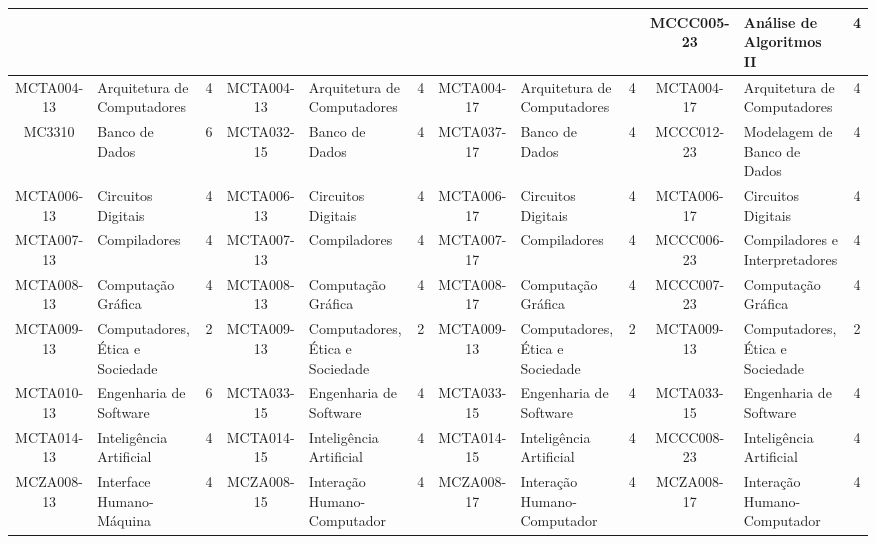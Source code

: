 \documentclass[a4paper]{article}
\begin{document}
\begin{landscape}
{\begin{longtable}{|c|p{.2\textheight}|c||c|p{.2\textheight}|c||c|p{.2\textheight}|c||c|p{.2\textheight}|c|}
    & & &
    & & &
    & & &
    MCCC005-23 & Análise de Algoritmos II & 4 \\ \hline

    MCTA004-13 & Arquitetura de Computadores & 4 &
    MCTA004-13 & Arquitetura de Computadores & 4 &
    MCTA004-17 & Arquitetura de Computadores & 4 &
    MCTA004-17 & Arquitetura de Computadores & 4 \\ \hline

    MC3310 & Banco de Dados & 6 &
    MCTA032-15 & Banco de Dados & 4 &
    MCTA037-17 & Banco de Dados & 4 &
    MCCC012-23 & Modelagem de Banco de Dados & 4 \\ \hline

    MCTA006-13 & Circuitos Digitais & 4 &
    MCTA006-13 & Circuitos Digitais & 4 &
    MCTA006-17 & Circuitos Digitais & 4 &
    MCTA006-17 & Circuitos Digitais & 4 \\ \hline

    MCTA007-13 & Compiladores & 4 &
    MCTA007-13 & Compiladores & 4 &
    MCTA007-17 & Compiladores & 4 & 
    MCCC006-23 & Compiladores e Interpretadores & 4 \\ \hline

    MCTA008-13 & Computação Gráfica & 4 &
    MCTA008-13 & Computação Gráfica & 4 &
    MCTA008-17 & Computação Gráfica & 4 &
    MCCC007-23 & Computação Gráfica & 4 \\ \hline

    MCTA009-13 & Computadores, Ética e Sociedade & 2 &
    MCTA009-13 & Computadores, Ética e Sociedade & 2 &
    MCTA009-13 & Computadores, Ética e Sociedade & 2 &
    MCTA009-13 & Computadores, Ética e Sociedade & 2 \\ \hline

    MCTA010-13 & Engenharia de Software & 6 &
    MCTA033-15 & Engenharia de Software & 4 & 
    MCTA033-15 & Engenharia de Software & 4 & 
    MCTA033-15 & Engenharia de Software & 4 \\ \hline

    MCTA014-13 & Inteligência Artificial & 4 &
    MCTA014-15 & Inteligência Artificial & 4 & 
    MCTA014-15 & Inteligência Artificial & 4 &
    MCCC008-23 & Inteligência Artificial & 4 \\ \hline

    MCZA008-13 & Interface Humano-Máquina    & 4 &
    MCZA008-15 & Interação Humano-Computador & 4 &
    MCZA008-17 & Interação Humano-Computador & 4 &
    MCZA008-17 & Interação Humano-Computador & 4\\ \hline



\end{longtable}}
\end{landscape}
\end{document}
